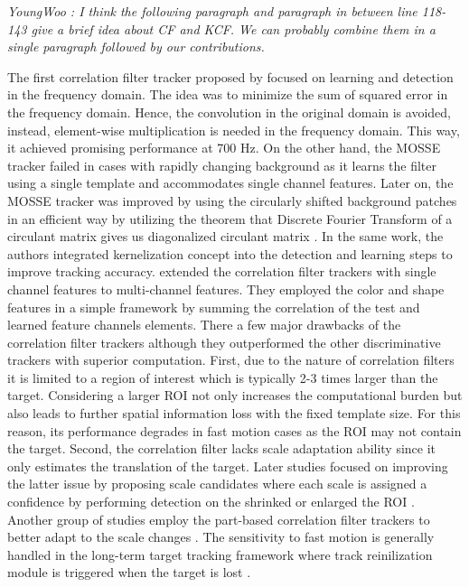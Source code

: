 \documentclass[10pt,twocolumn,letterpaper]{article}
\newcounter{ct}
\begin{document}
{\it YoungWoo : I think the following paragraph and paragraph in between line 118-143 give a brief idea about CF and KCF. We can probably combine them in a single paragraph followed by our contributions.}

The first correlation filter tracker proposed by
\cite{bolme2010visual} focused on learning and detection in the
frequency domain. The idea was to minimize the sum of squared error in
the frequency domain. Hence, the convolution in the original domain is
avoided, instead, element-wise multiplication is needed in the
frequency domain. This way, it achieved promising performance at 700
Hz. On the other hand, the MOSSE tracker failed in cases with rapidly
changing background as it learns the filter using a single template
and accommodates single channel features. Later on, the MOSSE tracker
was improved by using the circularly shifted background patches in an
efficient way by utilizing the theorem that Discrete Fourier Transform
of a circulant matrix gives us diagonalized circulant matrix
\cite{henriques2012exploiting,henriques2015high}. In the same work,
the authors integrated kernelization concept into the detection and
learning steps to improve tracking
accuracy. \cite{galoogahi2013multi,henriques2015high} extended the
correlation filter trackers with single channel features to
multi-channel features. They employed the color and shape features in
a simple framework by summing the correlation of the test and learned
feature channels elements. There a few major drawbacks of the
correlation filter trackers although they outperformed the other
discriminative trackers with superior computation. First, due to the
nature of correlation filters it is limited to a region of interest
which is typically 2-3 times larger than the target. Considering a
larger ROI not only increases the computational burden but also leads
to further spatial information loss with the fixed template size. For
this reason, its performance degrades in fast motion cases as the ROI
may not contain the target. Second, the correlation filter lacks scale
adaptation ability since it only estimates the translation of the
target. Later studies focused on improving the latter issue by
proposing scale candidates where each scale is assigned a confidence
by performing detection on the shrinked or enlarged the ROI
\cite{li2014scale,tang2015multi,bibi2015multi,ma2015long}. Another
group of studies employ the part-based correlation filter trackers to
better adapt to the scale changes
\cite{liu2015real,akin2016deformable}. The sensitivity to fast motion
is generally handled in the long-term target tracking framework where
track reinilization module is triggered when the target is lost
\cite{ma2015long,de2015board,li2016monocular}.
\end{document}
